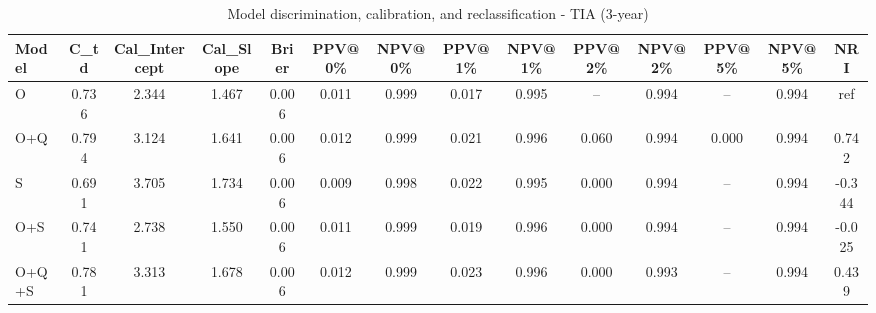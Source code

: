 \begin{table}[htbp]
\centering
\small
\caption{Model discrimination, calibration, and reclassification - TIA (3-year)}
\label{tab:perf_tia_3y}
\begin{tabular}{lccccccccccccc}
\toprule
Model & C\_td & Cal\_Intercept & Cal\_Slope & Brier & PPV@0\% & NPV@0\% & PPV@1\% & NPV@1\% & PPV@2\% & NPV@2\% & PPV@5\% & NPV@5\% & NRI \\
\midrule
O & 0.736 & 2.344 & 1.467 & 0.006 & 0.011 & 0.999 & 0.017 & 0.995 & -- & 0.994 & -- & 0.994 & ref \\
O+Q & 0.794 & 3.124 & 1.641 & 0.006 & 0.012 & 0.999 & 0.021 & 0.996 & 0.060 & 0.994 & 0.000 & 0.994 & 0.742 \\
S & 0.691 & 3.705 & 1.734 & 0.006 & 0.009 & 0.998 & 0.022 & 0.995 & 0.000 & 0.994 & -- & 0.994 & -0.344 \\
O+S & 0.741 & 2.738 & 1.550 & 0.006 & 0.011 & 0.999 & 0.019 & 0.996 & 0.000 & 0.994 & -- & 0.994 & -0.025 \\
O+Q+S & 0.781 & 3.313 & 1.678 & 0.006 & 0.012 & 0.999 & 0.023 & 0.996 & 0.000 & 0.993 & -- & 0.994 & 0.439 \\
\bottomrule
\end{tabular}
\end{table}